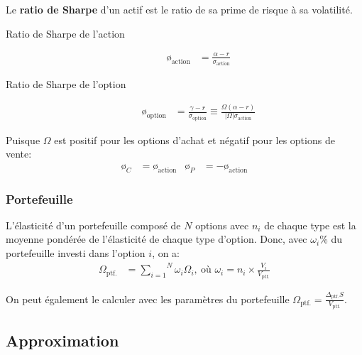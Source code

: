 \documentclass[10pt, french]{article}
\begin{document}
\begin{multicols*}{2}
\begin{definitionNOHFILL}
Le \textbf{ratio de Sharpe} d'un actif est le ratio de sa prime de risque à sa volatilité.
\begin{description}
	\item[Ratio de Sharpe de l'action]	
		\begin{align*}
		\text{\o}_{\text{action}}	
		&=	\frac{\alpha - r}{\sigma_{\text{action}}}
		\end{align*}
	\item[Ratio de Sharpe de l'option]	
		\begin{align*}
		\text{\o}_{\text{option}}	
		&=	\frac{\gamma - r}{\sigma_{\text{option}}}	
		\equiv	\frac{\Omega (\alpha - r)}{|\Omega|\sigma_{\text{action}}}	
		\end{align*}
\end{description}
Puisque $\Omega$ est positif pour les options d'achat et négatif pour les options de vente:
\begin{align*}
	\text{\o}_{C}	&=	\text{\o}_{\text{action}}	&
	\text{\o}_{P}	&=	-\text{\o}_{\text{action}}
\end{align*}
\end{definitionNOHFILL}

\subsubsection*{Portefeuille}

L'élasticité d'un portefeuille composé de $N$ options avec $n_{i}$ de chaque type est la moyenne pondérée de l'élasticité de chaque type d'option. Donc, avec $\omega_{i}$\% du portefeuille investi dans l'option $i$, on a:
\begin{align*}
	\Omega_{\text{ptf.}}
	&=	\overset{N}{\underset{i = 1}{\sum}} \omega_{i} \Omega_{i}, \: \text{où } \omega_{i} = n_{i} \times \frac{V_{i}}{V_{\text{ptf.}}}
\end{align*}

On peut également le calculer avec les paramètres du portefeuille $\Omega_{\text{ptf.}} = \frac{\Delta_{\text{ptf.}}S}{V_{\text{ptf.}}}$.

\subsection*{Approximation}


\end{multicols*}
\end{document}

